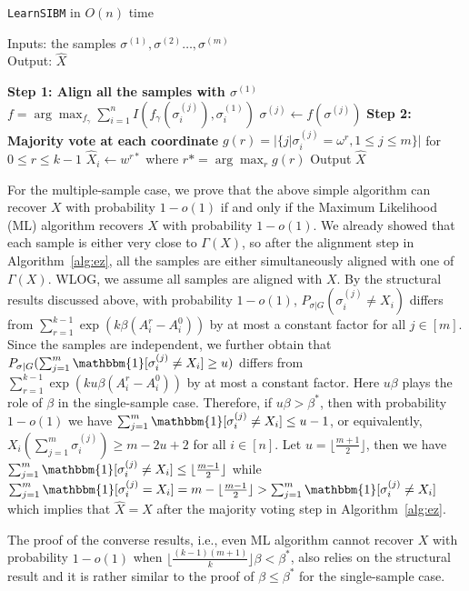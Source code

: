 \documentclass[conference]{IEEEtran}
\begin{document}
		\begin{algorithm}
			\caption{\texttt{LearnSIBM} in $O(n)$ time} \label{alg:ez}
			Inputs: the samples $\sigma^{(1)},\sigma^{(2)}\dots,\sigma^{(m)}$ \\
			Output: $\hat{X}$
			\begin{algorithmic}[1]
				\Statex \hspace*{-0.3in} 
				{\bf Step 1: Align all the samples with $\sigma^{(1)}$ }
				\State $f=\arg\max_{f_{\gamma}} \sum_{i=1}^n I(f_{\gamma}(\sigma^{(j)}_i), \sigma^{(1)}_i)$
				\State $\sigma^{(j)} \gets f(\sigma^{(j)})$
				\EndFor
				\Statex \hspace*{-0.3in}
				{\bf Step 2: Majority vote at each coordinate}
				\State $g(r) = |\{j | \sigma^{(j)}_i = \omega^r,1\leq j \leq m\}|$  for $ 0 \leq r \leq k-1$
				\State $\hat{X}_i \gets w^{r*}$ where $r*=\arg\max_r g(r)$
			\State{}
				\EndFor
				\State Output $\hat{X}$
			\end{algorithmic}
		\end{algorithm}
For the multiple-sample case, we prove that the above simple algorithm can recover $X$ with probability $1-o(1)$ if and only if the Maximum Likelihood (ML) algorithm recovers $X$ with probability $1-o(1)$. We already showed that each sample is either very close to $\Gamma(X)$, so after the alignment step in Algorithm~\ref{alg:ez}, all the samples are either simultaneously aligned with one of $\Gamma(X)$. WLOG, we assume all samples are aligned with $X$.
By the structural results discussed above, with probability $1-o(1)$, $P_{\sigma|G}(\sigma_i^{(j)} \neq X_i)$ differs from $\sum_{r=1}^{k-1} \exp (k \beta (A^r_i-A^0_i))$ by at most a constant factor for all $j\in[m]$. Since the samples are independent, we further obtain that $P_{\sigma|G}(\sum_{j=1}^m\mathbbm{1}[\sigma_i^{(j)} \neq X_i]\ge u)$ differs from $\sum_{r=1}^{k-1} \exp (k u \beta (A^r_i-A^0_i))$
by at most a constant factor.
Here $u\beta$ plays the role of $\beta$ in the single-sample case.
Therefore, if $u\beta>\beta^\ast$, then with probability $1-o(1)$ we have $\sum_{j=1}^m\mathbbm{1}[\sigma_i^{(j)} \neq X_i] \le u-1$, or equivalently, $X_i(\sum_{j=1}^m \sigma_i^{(j)} ) \ge m-2u+2$ for all $i\in[n]$. Let $u=\lfloor \frac{m+1}{2} \rfloor$,
then we have $\sum_{j=1}^m\mathbbm{1}[\sigma_i^{(j)} \neq X_i] \le \lfloor \frac{m-1}{2} \rfloor $ while $\sum_{j=1}^m\mathbbm{1}[\sigma_i^{(j)} = X_i]
= m - \lfloor \frac{m-1}{2} \rfloor > \sum_{j=1}^m\mathbbm{1}[\sigma_i^{(j)} \neq X_i] $
which implies that $\hat{X}=X$ after the majority voting step in Algorithm~\ref{alg:ez}.

The proof of the converse results, i.e., even ML algorithm cannot recover $X$ with probability $1-o(1)$ when $\lfloor \frac{(k-1)(m+1)}{k} \rfloor  \beta < \beta^\ast$, also relies on the structural result and it is rather similar to the proof of $\beta\le\beta^\ast$ for the single-sample case.




\end{document}
